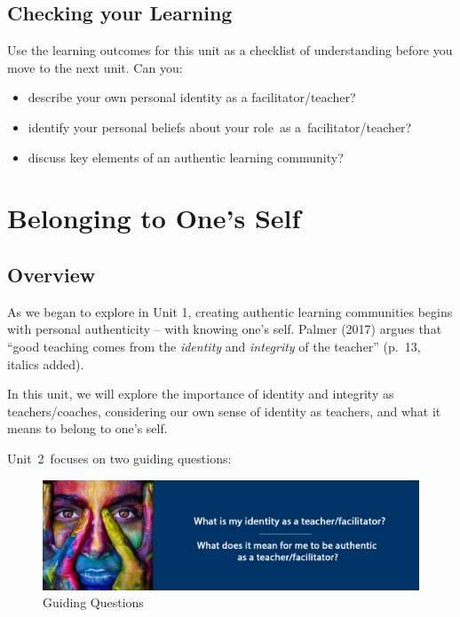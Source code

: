 \documentclass[
]{book}
\providecommand{\tightlist}{%
  \setlength{\itemsep}{0pt}\setlength{\parskip}{0pt}}
\begin{document}
\hypertarget{checking-your-learning}{%
\section*{Checking your Learning}\label{checking-your-learning}}

\begin{progress}
Use the learning outcomes for this unit as a checklist of understanding
before you move to the next unit. Can you:

\begin{itemize}
\tightlist
\item
  describe your own personal identity as a facilitator/teacher?
\item
  identify your personal beliefs about your role~as
  a~facilitator/teacher?
\item
  discuss key elements of an authentic learning community?
\end{itemize}
\end{progress}

\hypertarget{belonging-to-ones-self}{%
\chapter{Belonging to One's Self}\label{belonging-to-ones-self}}

\hypertarget{overview-1}{%
\section*{Overview}\label{overview-1}}

As we began to explore in Unit 1, creating authentic learning communities begins with personal authenticity -- with knowing one's self. Palmer (2017) argues that ``good teaching comes from the \emph{identity} and \emph{integrity} of the teacher'' (p.~13, italics added).

In this unit, we will explore the importance of identity and integrity as teachers/coaches, considering our own sense of identity as teachers, and what it means to belong to one's self.

Unit~2~focuses on two guiding questions:

\begin{figure}
\centering
\includegraphics{assets/unit2/LDRS664-BannerUnit2-v3.jpg}
\caption{Guiding Questions}
\end{figure}
\end{document}
